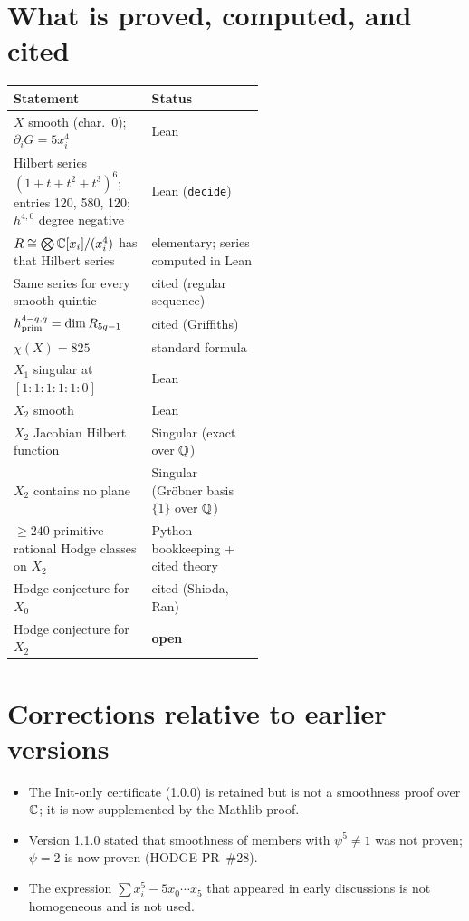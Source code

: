 \documentclass[11pt]{article}
\theoremstyle{definition}\newtheorem{definition}[theorem]{Definition}\newtheorem{remark}[theorem]{Remark}
\begin{document}
\section{What is proved, computed, and cited}
\begin{center}\small
\begin{tabular}{p{0.55\linewidth}l}\toprule
Statement & Status\\\midrule
$X$ smooth (char.\ 0); $\partial_iG=5x_i^4$ & Lean\\
Hilbert series $(1+t+t^2+t^3)^6$; entries 120, 580, 120; $h^{4,0}$ degree negative & Lean (\texttt{decide})\\
$R\cong\bigotimes\mathbb{C}[x_i]/(x_i^4)$ has that Hilbert series & elementary; series computed in Lean\\
Same series for every smooth quintic & cited (regular sequence)\\
$h^{4-q,q}_{\rm prim}=\dim R_{5q-1}$ & cited (Griffiths)\\
$\chi(X)=825$ & standard formula\\
$X_1$ singular at $[1:1:1:1:1:0]$ & Lean\\
$X_2$ smooth & Lean\\
$X_2$ Jacobian Hilbert function & Singular (exact over $\mathbb{Q}$)\\
$X_2$ contains no plane & Singular (Gr\"obner basis $\{1\}$ over $\mathbb{Q}$)\\
$\ge240$ primitive rational Hodge classes on $X_2$ & Python bookkeeping + cited theory\\
Hodge conjecture for $X_0$ & cited (Shioda, Ran)\\
Hodge conjecture for $X_2$ & \textbf{open}\\\bottomrule
\end{tabular}\end{center}

\section{Corrections relative to earlier versions}
\begin{itemize}
\item The Init-only certificate (1.0.0) is retained but is not a smoothness proof over $\mathbb{C}$; it is now supplemented by the Mathlib proof.
\item Version 1.1.0 stated that smoothness of members with $\psi^5\neq1$ was not proven; $\psi=2$ is now proven (HODGE PR~\#28).
\item The expression $\sum x_i^5-5x_0\cdots x_5$ that appeared in early discussions is not homogeneous and is not used.
\end{itemize}
\end{document}
